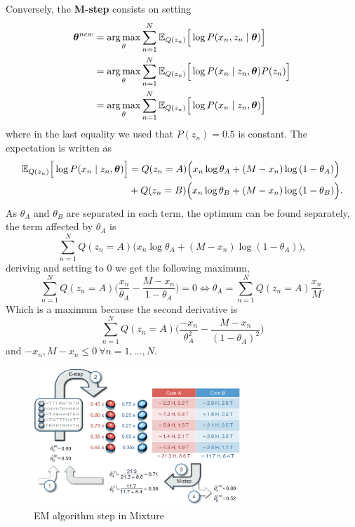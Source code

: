 Conversely, the \textbf{M-step} consists on setting
\[
  \begin{aligned}
    \bm{\theta}^{new} &= \operatorname*{arg\,max}_{\theta} \sum_{n=1}^{N}\mathbb{E}_{Q(z_{n})}\Big[\log P(x_{n}, z_{n} \mid \bm{\theta})\Big]\\
    &= \operatorname*{arg\,max}_{\theta} \sum_{n=1}^{N}\mathbb{E}_{Q(z_{n})}\Big[\log P(x_{n} \mid z_{n}, \bm{\theta})P(z_{n})\Big]\\
    &= \operatorname*{arg\,max}_{\theta} \sum_{n=1}^{N}\mathbb{E}_{Q(z_{n})}\Big[\log P(x_{n} \mid z_{n}, \bm{\theta})\Big]
  \end{aligned}
\]
where in the last equality we used that \(P(z_{n}) = 0.5\) is constant. The expectation is written as
\[
  \begin{aligned}
    \mathbb{E}_{Q(z_{n})}\Big[\log P(x_{n} \mid z_{n}, \bm{\theta})\Big] &= Q(z_{n} = A)\Big( x_{n}\log{\theta_{A}} + (M - x_{n})\log{(1 - \theta_{A})} \Big)\\
    &+ Q(z_{n} = B)\Big( x_{n}\log{\theta_{B}} + (M - x_{n})\log{(1 - \theta_{B})} \Big).
  \end{aligned}
\]
As \(\theta_{A}\) and \(\theta_{B}\) are separated in each term, the optimum can be found separately, the term affected by \(\theta_{A}\) is
\[
  \sum_{n=1}^{N} Q(z_{n}=A) \Big(x_{n}\log{\theta_{A}} + (M - x_{n})\log{(1-\theta_{A})}\Big),
\]
deriving and setting to \(0\) we get the following maximum,
\[
  \sum_{n=1}^{N}Q(z_{n}=A)\Big(\frac{x_{n}}{\theta_{A}} - \frac{M - x_{n}}{1- \theta_{A}}\Big) = 0 \iff \theta_{A} = \sum_{n=1}^{N}Q(z_{n}=A)\frac{x_{n}}{M}.
\]
Which is a maximum because the second derivative is
\[
   \sum_{n=1}^{N}Q(z_{n}=A)\Big(\frac{-x_{n}}{\theta_{A}^{2}} - \frac{M - x_{n}}{(1- \theta_{A})^{2}}\Big)
 \]
 and \(-x_{n}, M-x_{n} \leq 0 \ \forall n = 1,\dots, N\).
\begin{figure}
  \centering
  \includegraphics[width=0.7\textwidth]{tex/images/mixture}
  \caption{EM algorithm step in Mixture~\cite{do2008expectation}}\label{fig:mixture}
\end{figure}

